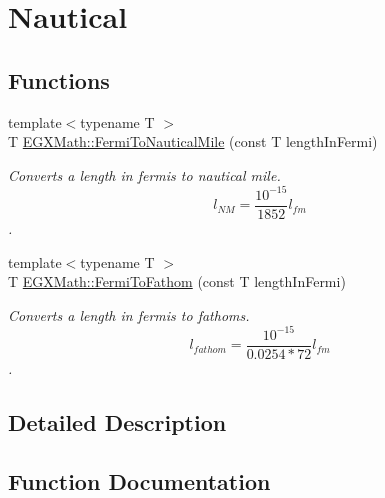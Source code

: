 \hypertarget{group___e_g_x_math-_conversions-_length_conversions-_non-_s_i-_fermi-_nautical}{}\section{Nautical}
\label{group___e_g_x_math-_conversions-_length_conversions-_non-_s_i-_fermi-_nautical}
\subsection*{Functions}
\begin{DoxyCompactItemize}
\item 
{\footnotesize template$<$typename T $>$ }\\T \mbox{\hyperlink{group___e_g_x_math-_conversions-_length_conversions-_non-_s_i-_fermi-_nautical_gac5966592cf227d0a5aa87ead6a4ca7d8}{E\+G\+X\+Math\+::\+Fermi\+To\+Nautical\+Mile}} (const T length\+In\+Fermi)
\begin{DoxyCompactList}\small\item\em Converts a length in fermis to nautical mile. \[ l_{NM}= \frac{10^{-15}}{1852} l_{fm} \]. \end{DoxyCompactList}\item 
{\footnotesize template$<$typename T $>$ }\\T \mbox{\hyperlink{group___e_g_x_math-_conversions-_length_conversions-_non-_s_i-_fermi-_nautical_ga4c2e2453ec319beb8e5a397ded99967a}{E\+G\+X\+Math\+::\+Fermi\+To\+Fathom}} (const T length\+In\+Fermi)
\begin{DoxyCompactList}\small\item\em Converts a length in fermis to fathoms. \[ l_{fathom}= \frac{10^{-15}}{0.0254 * 72} l_{fm} \]. \end{DoxyCompactList}\end{DoxyCompactItemize}


\subsection{Detailed Description}


\subsection{Function Documentation}
\mbox{\label{group___e_g_x_math-_conversions-_length_conversions-_non-_s_i-_fermi-_nautical_ga4c2e2453ec319beb8e5a397ded99967a}} 
